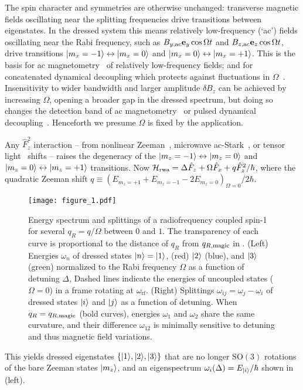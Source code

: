 \documentclass[aps,prl,reprint,superscriptaddress,floatfix]{revtex4-1}
\begin{document}
The spin character and symmetries are otherwise unchanged: transverse magnetic fields oscillating near the splitting frequencies drive transitions between eigenstates.
In the dressed system this means relatively low-frequency (`ac') fields oscillating near the Rabi frequency, such as $B_{y,\text{ac}} \mathbf{e}_y \cos \Omega t$ and $B_{z,\text{ac}} \mathbf{e}_z \cos \Omega t$, drive transitions $\vert m_x=-1 \rangle  \leftrightarrow \vert m_x=0 \rangle $ and $\vert m_x=0 \rangle  \leftrightarrow \vert m_x=+1 \rangle $.
This is the basis for ac magnetometry~\cite{hirose_continuous_2012} of relatively low-frequency fields; and for concatenated dynamical decoupling  which protects against fluctuations in $\Omega$~\cite{cai_robust_2012}.
Insensitivity to wider bandwidth and larger amplitude $\delta B_z$ can be achieved by increasing $\Omega$, opening a broader gap in the dressed spectrum, but doing so changes the detection band of ac magnetometry~\cite{loretz_radio-frequency_2013} or pulsed dynamical decoupling~\cite{boss_quantum_2017,*schmitt_submillihertz_2017}.
Henceforth we presume $\Omega$ is fixed by the application.

Any $\hat{F}_z^2$ interaction -- from nonlinear Zeeman~\cite{ramsey_molecular_1956}, microwave ac-Stark~\cite{gerbier_resonant_2006}, or tensor light~\cite{smith_continuous_2004} shifts -- raises the degeneracy of the $\vert m_z=-1 \rangle  \leftrightarrow \vert m_z=0 \rangle $ and $\vert m_z=0 \rangle  \leftrightarrow \vert m_z=+1 \rangle $ transitions. 
Now $\mathcal{H}_{\text{rwa}} = \Delta \hat{F}_z + \Omega \hat{F}_x + q \hat{F}_z^2/\hbar$, where the quadratic Zeeman shift $q \equiv (E_{m_z=+1} + E_{m_z=-1} - 2 E_{m_z=0})_{\Omega=0}/2\hbar$.
\begin{figure}
    \texttt{[image: figure\_1.pdf]}
    \caption{
    \label{fig:eigensystem_schematic}
        Energy spectrum and splittings of a radiofrequency coupled spin-1 for several $q_R = q/\Omega$ between $0$ and $1$.
        The transparency of each curve is proportional to the distance of $q_R$ from $q_{R,\text{magic}}$ in .
        (Left) Energies $\omega_n$ of dressed states $\vert n \rangle =\vert 1 \rangle $, (red) $\vert 2 \rangle $ (blue), and $\vert 3 \rangle $ (green) normalized to the Rabi frequency $\Omega$ as a function of detuning $\Delta$,
        Dashed lines indicate the energies of uncoupled states ($\Omega=0$) in a frame rotating at $\omega_{\text{rf}}$.
        (Right) Splittings $\omega_{ij} = \omega_j - \omega_i$ of dressed states $\vert i \rangle $ and $\vert j \rangle $ as a function of detuning.
        When $q_R=q_{R,\text{magic}}$ (bold curves), energies $\omega_1$ and $\omega_2$ share the same curvature, and their difference $\omega_{12}$ is minimally sensitive to detuning and thus magnetic field variations.
    }
\end{figure}
This yields dressed eigenstates $\{\vert 1 \rangle , \vert 2 \rangle , \vert 3 \rangle \}$ that are no longer $\text{SO}(3)$ rotations of the bare Zeeman states $\vert m_z \rangle $, and an eigenspectrum $\omega_i(\Delta) = E_{\vert i \rangle }/\hbar$ shown in  (left).
\end{document}
